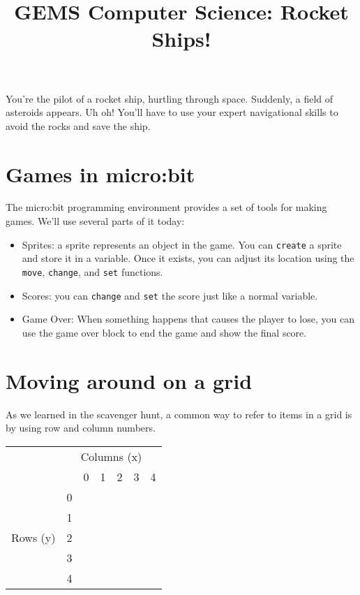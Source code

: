 \documentclass{article}
\begin{document}
\title{GEMS Computer Science: Rocket Ships!}
\date{}
\maketitle

\begin{multicols*}{2}
You're the pilot of a rocket ship, hurtling through space. Suddenly, a field of asteroids appears. Uh oh! You'll have to use your expert navigational skills to avoid the rocks and save the ship.

\section{Games in micro:bit}
The micro:bit programming environment provides a set of tools for making games. We'll use several parts of it today:
\begin{itemize}
  \item Sprites: a sprite represents an object in the game. You can \texttt{create} a sprite and store it in a variable. Once it exists, you can adjust its location using the \texttt{move}, \texttt{change}, and \texttt{set} functions.
  \item Scores: you can \texttt{change} and \texttt{set} the score just like a normal variable.
  \item Game Over: When something happens that causes the player to lose, you can use the game over block to end the game and show the final score.
\end{itemize}

\section{Moving around on a grid}
As we learned in the scavenger hunt, a common way to refer to items in a grid is by using row and column numbers.

\begin{center}
\begin{tabular}{*{7}{c|}}
\multicolumn{1}{c}{} & \multicolumn{6}{c}{Columns (x)} \\ 
\multicolumn{2}{c}{} & \multicolumn{1}{c}{0} & \multicolumn{1}{c}{1} & \multicolumn{1}{c}{2} & \multicolumn{1}{c}{3} & \multicolumn{1}{c}{4} 
\\ \cline{3-7}
\multirow{5}{*}{Rows (y)} & 0 & & & & & \\ \cline{3-7}
                      & 1 & & & & & \\ \cline{3-7}
                      & 2 & & & & & \\ \cline{3-7}
                      & 3 & & & & & \\ \cline{3-7}
                      & 4 & & & & & \\ \cline{3-7}
\end{tabular}
\end{center}


\end{multicols*}
\end{document}
